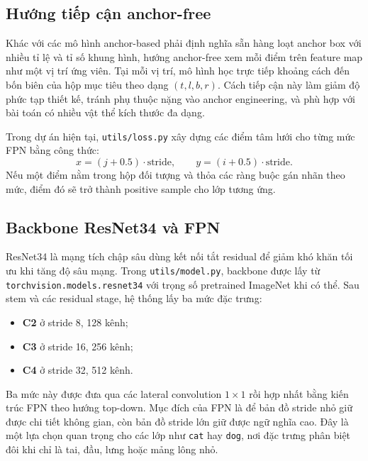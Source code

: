\documentclass[12pt,a4paper]{article}
\begin{document}
\subsection{Hướng tiếp cận anchor-free}
Khác với các mô hình anchor-based phải định nghĩa sẵn hàng loạt anchor box với nhiều tỉ lệ và tỉ số khung hình, hướng anchor-free xem mỗi điểm trên feature map như một vị trí ứng viên. Tại mỗi vị trí, mô hình học trực tiếp khoảng cách đến bốn biên của hộp mục tiêu theo dạng $(t,l,b,r)$. Cách tiếp cận này làm giảm độ phức tạp thiết kế, tránh phụ thuộc nặng vào anchor engineering, và phù hợp với bài toán có nhiều vật thể kích thước đa dạng.

Trong dự án hiện tại, \texttt{utils/loss.py} xây dựng các điểm tâm lưới cho từng mức FPN bằng công thức:
\[
x = (j + 0.5)\cdot \text{stride}, \qquad y = (i + 0.5)\cdot \text{stride}.
\]
Nếu một điểm nằm trong hộp đối tượng và thỏa các ràng buộc gán nhãn theo mức, điểm đó sẽ trở thành positive sample cho lớp tương ứng.

\subsection{Backbone ResNet34 và FPN}
ResNet34 là mạng tích chập sâu dùng kết nối tắt residual để giảm khó khăn tối ưu khi tăng độ sâu mạng. Trong \texttt{utils/model.py}, backbone được lấy từ \texttt{torchvision.models.resnet34} với trọng số pretrained ImageNet khi có thể. Sau stem và các residual stage, hệ thống lấy ba mức đặc trưng:
\begin{itemize}
    \item \textbf{C2} ở stride 8, 128 kênh;
    \item \textbf{C3} ở stride 16, 256 kênh;
    \item \textbf{C4} ở stride 32, 512 kênh.
\end{itemize}

Ba mức này được đưa qua các lateral convolution $1\times1$ rồi hợp nhất bằng kiến trúc FPN theo hướng top-down. Mục đích của FPN là để bản đồ stride nhỏ giữ được chi tiết không gian, còn bản đồ stride lớn giữ được ngữ nghĩa cao. Đây là một lựa chọn quan trọng cho các lớp như \texttt{cat} hay \texttt{dog}, nơi đặc trưng phân biệt đôi khi chỉ là tai, đầu, lưng hoặc mảng lông nhỏ.
\end{document}
